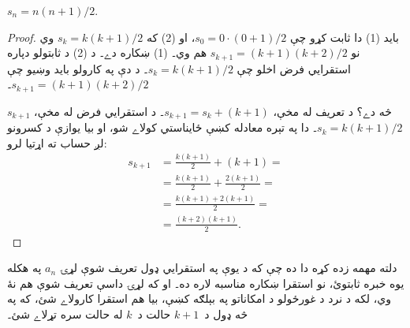\documentclass[../../../include/open-logic-section]{subfiles}
\begin{document}
\begin{prop}
  $s_n = n(n+1)/2$.
\end{prop}

\begin{proof}
بايد (1) دا ثابت کړو چې $s_0 = 0\cdot(0 + 1)/2$، او (2)
که $s_k =
  k(k+1)/2$ وي نو $s_{k+1} = (k+1)(k+2)/2$ هم وي۔ (1)
ښکاره دے۔ د (2) د ثابتولو دپاره استقرايي فرض اخلو چې
$s_k = k(k+1)/2$۔ د دې په کارولو بايد وښيو چې
$s_{k+1} = (k+1)(k+2)/2$۔

$s_{k+1}$ څه دے؟ د تعريف له مخې، $s_{k+1} = s_k + (k+1)$۔
د استقرايي فرض له مخې، $s_k = k(k+1)/2$۔ دا په تېره
معادله کښې ځايناستي کولاے شو، او بيا يوازې د کسرونو لږ
حساب ته اړتيا لرو:
  \begin{align*}
    s_{k+1} & = \frac{k(k+1)}{2} + (k+1) = {}\\
    & = \frac{k(k+1)}{2} + \frac{2(k+1)}{2} = {}\\
    & = \frac{k(k+1) + 2(k+1)}{2} = {}\\
    & = \frac{(k+2)(k+1)}{2}.
  \end{align*}
\end{proof}

دلته مهمه زده کړه دا ده چې که د يوې په استقرايي ډول
تعريف شوې لړۍ $a_n$ په هکله يوه خبره ثابتوئ، نو استقرا
ښکاره مناسبه لاره ده۔ او که لړۍ داسې تعريف شوې هم نۀ
وي، لکه د نرد د غورځولو د امکاناتو په بېلګه کښې، بيا
هم استقرا کارولاے شئ، که په څه ډول د~$k+1$ حالت د~$k$
له حالت سره تړلاے شئ۔
\end{document}
